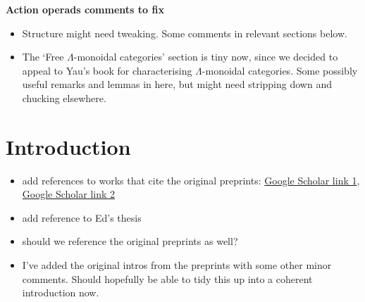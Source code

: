 \documentclass{amsart}
\begin{document}
\begin{center}
\begin{Large}
\textbf{Action operads comments to fix}
\end{Large}
\end{center}
\vskip1cm

\begin{itemize}
	\item Structure might need tweaking. Some comments in relevant sections below.
	\item The `Free $\Lambda$-monoidal categories' section is tiny now, since we decided to appeal to Yau's book for characterising $\Lambda$-monoidal categories. Some possibly useful remarks and lemmas in here, but might need stripping down and chucking elsewhere.
\end{itemize}

\section{Introduction}
\begin{itemize}
\item add references to works that cite the original preprints: \href{https://scholar.google.com/scholar?oi=bibs\&hl=en\&cites=3135675589124701435}{Google Scholar link 1}, \href{https://scholar.google.com/scholar?oi=bibs&hl=en&cites=13749645182111219012&as_sdt=5}{Google Scholar link 2}
\item add reference to Ed's thesis
\item should we reference the original preprints as well?
\item I've added the original intros from the preprints with some other minor comments. Should hopefully be able to tidy this up into a coherent introduction now.

\end{itemize}
\end{document}
